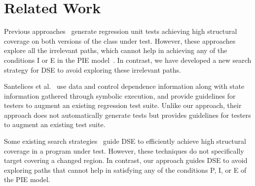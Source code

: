 
\section{Related Work}
\label{sec:related}
Previous approaches~\cite{evans:DiffTest07,taneja08:diffgen,jin10:automated} generate regression unit tests achieving high structural coverage on both versions of the class under test. However, these approaches explore all the irrelevant paths, which cannot help in achieving any of the conditions I or E in the PIE model~\cite{voas}. In contrast, we have developed a new search strategy for DSE to avoid exploring these irrelevant paths. 


Santelices et al.~\cite{Apiwattanapong2006AUG,santelices08sep} use data and control dependence information along with state information gathered through symbolic execution, and provide guidelines for testers to augment an existing regression test suite. Unlike our approach, their approach does not automatically generate tests but provides guidelines for testers to augment an existing test suite. 

Some existing search strategies~\cite{burnim,fitnex} guide DSE to efficiently achieve high structural coverage in a program under test. However,
these techniques do not specifically target covering a changed region. In contrast, our approach guides DSE to avoid exploring paths that cannot help in satisfying any of the conditions P, I, or E of the PIE model.

